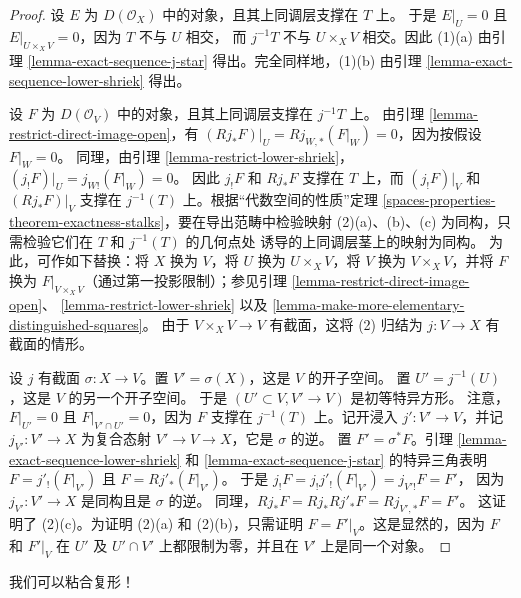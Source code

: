 \begin{proof}
设 $E$ 为 $D(\mathcal{O}_X)$ 中的对象，且其上同调层支撑在 $T$ 上。
于是 $E|_U = 0$ 且 $E|_{U \times_X V} = 0$，因为 $T$ 不与 $U$ 相交，
而 $j^{-1}T$ 不与 $U \times_X V$ 相交。因此 (1)(a) 由引理
\ref{lemma-exact-sequence-j-star} 得出。完全同样地，(1)(b) 由引理
\ref{lemma-exact-sequence-lower-shriek} 得出。

\medskip\noindent
设 $F$ 为 $D(\mathcal{O}_V)$ 中的对象，且其上同调层支撑在 $j^{-1}T$ 上。
由引理 \ref{lemma-restrict-direct-image-open}，有
$(Rj_*F)|_U = Rj_{W, *}(F|_W) = 0$，因为按假设 $F|_W = 0$。
同理，由引理 \ref{lemma-restrict-lower-shriek}，
$(j_!F)|_U = j_{W!}(F|_W) = 0$。
因此 $j_!F$ 和 $Rj_*F$ 支撑在 $T$ 上，而
$(j_!F)|_V$ 和 $(Rj_*F)|_V$ 支撑在 $j^{-1}(T)$ 上。根据“代数空间的性质”定理
\ref{spaces-properties-theorem-exactness-stalks}，要在导出范畴中检验映射
(2)(a)、(b)、(c) 为同构，只需检验它们在 $T$ 和 $j^{-1}(T)$ 的几何点处
诱导的上同调层茎上的映射为同构。 %
为此，可作如下替换：将 $X$ 换为 $V$，将 $U$ 换为
$U \times_X V$，将 $V$ 换为 $V \times_X V$，并将 $F$ 换为
$F|_{V \times_X V}$（通过第一投影限制）；参见引理
\ref{lemma-restrict-direct-image-open}、
\ref{lemma-restrict-lower-shriek} 以及
\ref{lemma-make-more-elementary-distinguished-squares}。
由于 $V \times_X V \to V$ 有截面，这将 (2) 归结为
$j : V \to X$ 有截面的情形。

\medskip\noindent
设 $j$ 有截面 $\sigma : X \to V$。置 $V' = \sigma(X)$，这是 $V$ 的开子空间。
置 $U' = j^{-1}(U)$，这是 $V$ 的另一个开子空间。
于是 $(U' \subset V, V' \to V)$ 是初等特异方形。
注意，$F|_{U'} = 0$ 且 $F|_{V' \cap U'} = 0$，因为 $F$ 支撑在
$j^{-1}(T)$ 上。记开浸入 $j' : V' \to V$，并记
$j_{V'} : V' \to X$ 为复合态射 $V' \to V \to X$，它是 $\sigma$ 的逆。
置 $F' = \sigma^*F$。引理
\ref{lemma-exact-sequence-lower-shriek} 和
\ref{lemma-exact-sequence-j-star} 的特异三角表明
$F = j'_!(F|_{V'})$ 且 $F = Rj'_*(F|_{V'})$。
于是
$j_!F = j_!j'_!(F|_{V'}) = j_{V'!}F = F'$，
因为 $j_{V'} : V' \to X$ 是同构且是 $\sigma$ 的逆。
同理，$Rj_*F = Rj_*Rj'_*F = Rj_{V', *}F = F'$。
这证明了 (2)(c)。为证明 (2)(a) 和 (2)(b)，只需证明
$F = F'|_V$。这是显然的，因为 $F$ 和 $F'|_V$ 在 $U'$ 及
$U' \cap V'$ 上都限制为零，并且在 $V'$ 上是同一个对象。
\end{proof}

\noindent
我们可以粘合复形！

